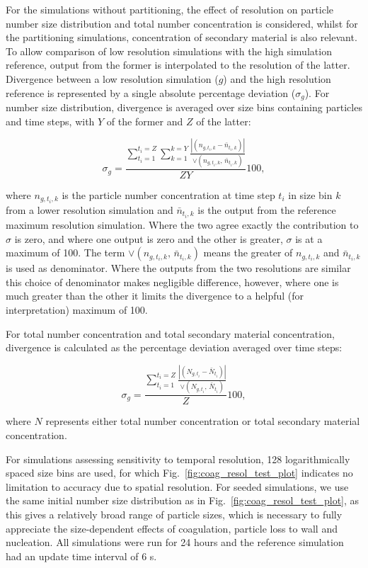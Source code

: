 \documentclass[gmd, manuscript]{copernicus}
\begin{document}
For the simulations without partitioning, the effect of resolution on particle number size distribution and total number concentration is considered, whilst for the partitioning simulations, concentration of secondary material is also relevant.  To allow comparison of low resolution simulations with the high simulation reference, output from the former is interpolated to the resolution of the latter.  Divergence between a low resolution simulation ($g$) and the high resolution reference is represented by a single absolute percentage deviation ($\sigma_g$).  For number size distribution, divergence  is averaged over size bins containing particles and time steps, with $Y$ of the former and $Z$ of the latter:

\begin{equation} \label{eq:tr_diverg_nsd}
\sigma_g= \frac{\sum_{t_i=1}^{t_i=Z} \sum_{k=1}^{k=Y}\frac{|(n_{g,t_i,k}-\bar{n}_{t_i,k})|}{\lor(n_{g,t_i,k},\, \bar{n}_{t_i,k})}}{ZY}100,
\end{equation}

where $n_{g,t_i,k}$ is the particle number concentration at time step $t_i$ in size bin $k$ from a lower resolution simulation and $\bar{n}_{t_i,k}$ is the output from the reference maximum resolution simulation.  Where the two agree exactly the contribution to $\sigma$ is zero, and where one output is zero and the other is greater, $\sigma$ is at a maximum of 100.  The term $\lor(n_{g,t_i,k},\, \bar{n}_{t_i,k})$ means the greater of $n_{g,t_i,k}$ and $\bar{n}_{t_i,k}$ is used as denominator.  Where the outputs from the two resolutions are similar this choice of denominator makes negligible difference, however, where one is much greater than the other it limits the divergence to a helpful (for interpretation) maximum of 100.  

For total number concentration and total secondary material concentration, divergence is calculated as the percentage deviation averaged over time steps:

\begin{equation} \label{eq:tr_diverg}
\sigma_g = \frac{\sum_{t_i=1}^{t_i=Z} \frac{|(N_{g,t_i}-\bar{N}_{t_i})|}{\lor(N_{g,t_i},\, \bar{N}_{t_i})}}{Z}100,
\end{equation}

where $N$ represents either total number concentration or total secondary material concentration.

For simulations assessing sensitivity to temporal resolution, 128 logarithmically spaced size bins are used, for which Fig.~\ref{fig:coag_resol_test_plot} indicates no limitation to accuracy due to spatial resolution.  For seeded simulations, we use the same initial number size distribution as in Fig.~\ref{fig:coag_resol_test_plot}, as this gives a relatively broad range of particle sizes, which is necessary to fully appreciate the size-dependent effects of coagulation, particle loss to wall and nucleation.  All simulations were run for 24 hours and the reference simulation had an update time interval of 6 \unit{s}.
\end{document}
